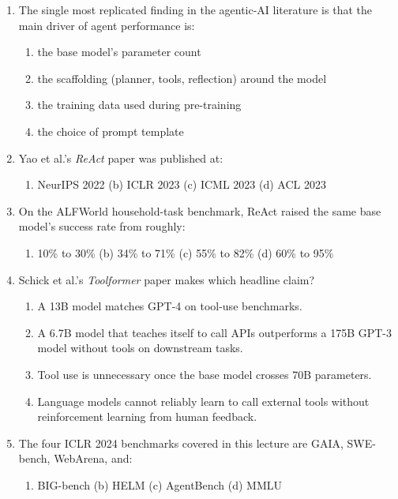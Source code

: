 \documentclass[11pt,a4paper]{article}
\begin{document}
\begin{enumerate}[label=Q\arabic*.]

\item The single most replicated finding in the agentic-AI literature is
      that the main driver of agent performance is:
\begin{enumerate}[label=(\alph*)]
  \item the base model's parameter count
  \item the scaffolding (planner, tools, reflection) around the model
  \item the training data used during pre-training
  \item the choice of prompt template
\end{enumerate}

\item Yao et al.'s \emph{ReAct} paper was published at:
\begin{enumerate}[label=(\alph*)]
  \item NeurIPS 2022 \qquad (b) ICLR 2023 \qquad (c) ICML 2023 \qquad (d) ACL 2023
\end{enumerate}

\item On the ALFWorld household-task benchmark, ReAct raised the same
      base model's success rate from roughly:
\begin{enumerate}[label=(\alph*)]
  \item 10\% to 30\% \qquad (b) 34\% to 71\% \qquad (c) 55\% to 82\% \qquad (d) 60\% to 95\%
\end{enumerate}

\item Schick et al.'s \emph{Toolformer} paper makes which headline claim?
\begin{enumerate}[label=(\alph*)]
  \item A 13B model matches GPT-4 on tool-use benchmarks.
  \item A 6.7B model that teaches itself to call APIs outperforms a
        175B GPT-3 model without tools on downstream tasks.
  \item Tool use is unnecessary once the base model crosses 70B
        parameters.
  \item Language models cannot reliably learn to call external tools
        without reinforcement learning from human feedback.
\end{enumerate}

\item The four ICLR 2024 benchmarks covered in this lecture are GAIA,
      SWE-bench, WebArena, and:
\begin{enumerate}[label=(\alph*)]
  \item BIG-bench \qquad (b) HELM \qquad (c) AgentBench \qquad (d) MMLU
\end{enumerate}


\end{enumerate}
\end{document}
